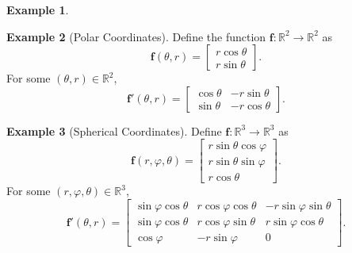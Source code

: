 \documentclass{article}
\newcommand{\R}{\mathbb{R}}
\newcommand{\x}{\mathbf{x}}
\newcommand{\f}{\mathbf{f}}
\theoremstyle{definition}
\newtheorem{example}{Example}[section]
\begin{document}
\begin{example}
\begin{figure}[h!]
			\caption{}
		\end{figure}	
		
		\begin{figure}[h!]
			\centering
			\caption{}
		\end{figure}	
	\end{example}
	
	\begin{example}[Polar Coordinates]
		Define the function $ \mathbf{f}:\R^2\to\R^2 $ as 
		$$ \f(\theta, r) =\begin{bmatrix}
			r\cos \theta\\r\sin\theta
		\end{bmatrix}  .$$ For some $ (\theta,r)\in \R^2 $, $$ \f'(\theta,r)=\begin{bmatrix}
			\cos\theta &-r\sin\theta\\\sin\theta&-r\cos\theta
		\end{bmatrix}.$$
	\end{example}
	
	\begin{example}[Spherical Coordinates]
		Define $ \f:\R^3\to\R^3 $ as 
		$$ \f(r, \varphi,\theta) =\begin{bmatrix}
			r\sin \theta\cos\varphi\\r\sin \theta\sin\varphi\\ r\cos\theta
		\end{bmatrix}  .$$ 
		For some $ (r, \varphi,\theta)\in \R^3 $, $$ \f'(\theta,r)=\begin{bmatrix}
			\sin\varphi\cos\theta & r\cos\varphi\cos\theta & - r\sin\varphi\sin\theta\\
			\sin\varphi\cos\theta & r\cos\varphi\sin\theta & r\sin\varphi\cos\theta\\
			\cos\varphi& -r\sin\varphi & 0
		\end{bmatrix}.$$
	\end{example}
	
\end{document}
